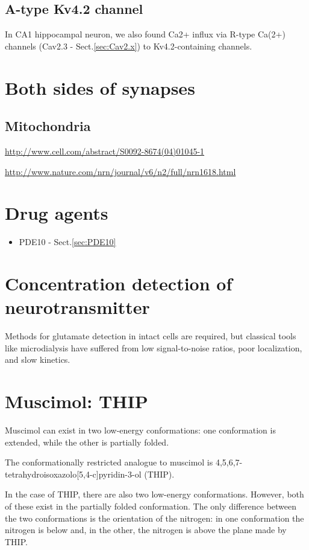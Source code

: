 \subsection{A-type Kv4.2 channel}

In CA1 hippocampal neuron, we also found Ca2+ influx via R-type Ca(2+) channels
(Cav2.3 - Sect.\ref{sec:Cav2.x}) to Kv4.2-containing channels.


 

\section{Both sides of synapses}
\label{sec:both-side-synapse}

\subsection{Mitochondria}

\url{http://www.cell.com/abstract/S0092-8674(04)01045-1}

\url{http://www.nature.com/nrn/journal/v6/n2/full/nrn1618.html}





\section{Drug agents}

\begin{itemize}
  \item PDE10 - Sect.\ref{sec:PDE10}
\end{itemize}

\section{Concentration detection of neurotransmitter}
\label{sec:glutamate-concentration-detection}

Methods for glutamate detection in intact cells are required, but classical
tools like microdialysis have suffered from low signal-to-noise ratios, poor
localization, and slow kinetics.


\section{Muscimol: THIP}
\label{sec:Muscimol}
\label{sec:THIP}

Muscimol can exist in two low-energy conformations: one conformation is
extended, while the other is partially folded. 

The conformationally restricted analogue to muscimol is 
4,5,6,7-tetrahydroisoxazolo[5,4-c]pyridin-3-ol (THIP).

In the case of THIP, there are also two low-energy conformations. However, both
of these exist in the partially folded conformation. The only difference between
the two conformations is the orientation of the nitrogen: in one conformation
the nitrogen is below and, in the other, the nitrogen is above the plane made by
THIP.
